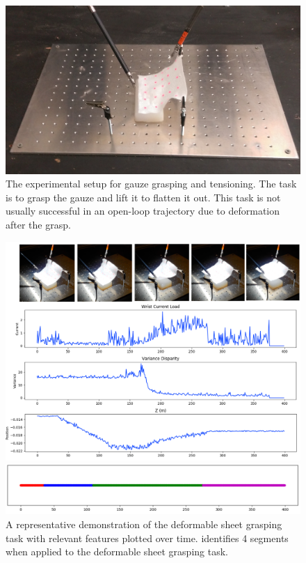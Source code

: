 \begin{figure}[t]
\centering
    \includegraphics[width=0.8\columnwidth]{exp/IMAG0249.jpg}
    \caption{The experimental setup for gauze grasping and tensioning. The task is to grasp the gauze and lift it to flatten it out. This task is not usually successful in an open-loop trajectory due to deformation after the grasp.
    }
    \label{exp:dvrk2}
\end{figure}

\begin{figure}[t]

    \includegraphics[width=\columnwidth]{exp/signals.png}
    \raggedright
    \includegraphics[width=0.9\columnwidth]{exp/segmentation.png}
    \caption{A representative demonstration of the deformable sheet grasping task with relevant features plotted over time. \hirl identifies 4 segments when applied to the deformable sheet grasping task. 
    }
    \label{exp:dvrk3}
\end{figure}

